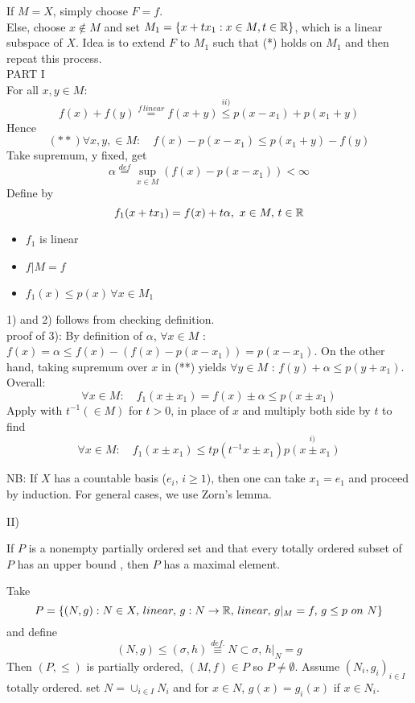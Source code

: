     If $M=X$, simply choose $F=f$.\\
    Else, choose $x\not \in M$ and set $M_1=\{x+tx_1:x\in M,t\in\mathbb{R}\}$, which is a linear subspace of $X$. Idea is to extend $F$ to $M_1$ such that  (*) holds on $M_1$ and then repeat this process.\\
    PART I\\
    For all $x,y\in M$:
    $$
    f(x)+f(y)
    \stackrel{f\,linear}{=}f(x+y)
    \stackrel{ii)}{\leq}p(x-x_1)+p(x_1+y)
    $$
    Hence
    $$
    (**)\forall x,y,\in M:\quad f(x)-p(x-x_1)\leq p(x_1+y)-f(y)
    $$
    Take supremum, y fixed, get 
    $$
\alpha\stackrel{def}{=}\sup_{x\in M}\left(f(x)-p(x-x_1)\right)<\infty
    $$
    Define  by 
    $$f_1(x+tx_1)=f(x)+t\alpha,\,\,x\in M,\,t\in \mathbb{R}$$
    \begin{lemma}
        \begin{itemize}
            \item $f_1$ is linear 
            \item $f|M=f$
            \item $f_1(x)\leq p(x)\,\forall x\in M_1$ 
        \end{itemize}
    \end{lemma}
    1) and 2) follows from checking definition.\\
    proof of 3):
    By definition of $\alpha$,  $\forall x\in M$ : $f(x)=\alpha\leq f(x)-(f(x)-p(x-x_1))=p(x-x_1)$. On the other hand, taking supremum over $x$ in (**) yields $\forall y \in M$ : $f(y)+\alpha\leq p(y+x_1)$. Overall:
    $$
    \forall x\in M:\quad f_1(x\pm x_1)=f(x)\pm \alpha\leq p(x\pm x_1)
    $$
    Apply with $t^{-1}(\in M)$ for $t>0$, in place of $x$ and multiply both side by $t$ to find
    $$
    \forall x\in M:\quad f_1(x\pm x_1)\leq  tp(t^{-1}x\pm x_1)\stackrel{i)}{p(x\pm x_1)}
    $$

    NB: If $X$ has a countable basis ($e_i,\,i\geq 1
    $), then one can take $x_1=e_1$ and proceed by induction. For general cases, we use Zorn's lemma.

    II)\\
    \begin{lemma}%
        \rm\nextline
        If $P$ is a nonempty partially ordered set and that every totally ordered subset of $P$ has an upper bound , then $P$ has
        a maximal element.
    \end{lemma}

    Take 
    $$
P=\{(N,g):N\in X,\,linear,\, g:N\rightarrow\mathbb{R},\,linear,\,g|_M=f,\,g\leq p\,\,on\,\, N\}
    $$
    and define
    $$
    (N,g)\leq(\sigma,h)\stackrel{def.}{\equiv}N\subset\sigma,\,h|_N=g
    $$
    Then $(P,\leq)$ is partially ordered, $(M,f)\in P$ so $P\not=\emptyset$. Assume $(N_i,g_i)_{i\in I}$ totally ordered. set $N=\cup_{i\in I}N_i$ and for $x\in N$, $g(x)=g_i(x)$ if $x\in N_i$.

